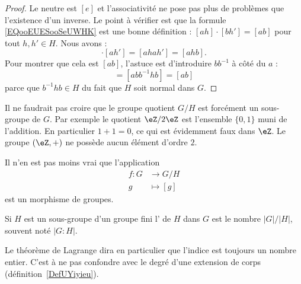 \begin{proof}
    Le neutre est \( [e]\) et l'associativité ne pose pas plus de problèmes que l'existence d'un inverse. Le point à vérifier est que la formule \eqref{EQooEUESooSeUWHK} est une bonne définition : \( [ah]\cdot [bh']=[ab]\) pour tout \( h,h'\in H\). Nous avons :
    \begin{equation}
        [ah]\cdot [ah']=[ahah']=[ahb].
    \end{equation}
    Pour montrer que cela est \( [ab]\), l'astuce est d'introduire \( bb^{-1}\) à côté du \( a\) :
    \begin{equation}
        [ahb]=[abb^{-1}hb]=[ab]
    \end{equation}
    parce que \( b^{-1} hb\in H\) du fait que \( H\) soit normal dans \( G\).
\end{proof}

\begin{example}      \label{EXooFNIKooHxePSs}
    Il ne faudrait pas croire que le groupe quotient \( G/H\) est forcément un sous-groupe de \( G\). Par exemple le quotient \( \eZ/2\eZ\) est l'ensemble \( \{ 0,1 \}\) muni de l'addition. En particulier \( 1+1=0\), ce qui est évidemment faux dans \( \eZ\). Le groupe \( (\eZ,+)\) ne possède aucun élément d'ordre \( 2\).

    Il n'en est pas moins vrai que l'application
    \begin{equation}
        \begin{aligned}
            f\colon G&\to G/H \\
            g&\mapsto [g]
        \end{aligned}
    \end{equation}
    est un morphisme de groupes.
\end{example}

\begin{definition}
    Si \( H\) est un sous-groupe d'un groupe fini l' de \( H\) dans \( G\) est le nombre \( | G |/| H |\), souvent noté \( | G:H |\).
\end{definition}

Le théorème de Lagrange dira en particulier que l'indice est toujours un nombre entier. C'est à ne pas confondre avec le degré d'une extension de corps (définition~\ref{DefUYiyieu}).


